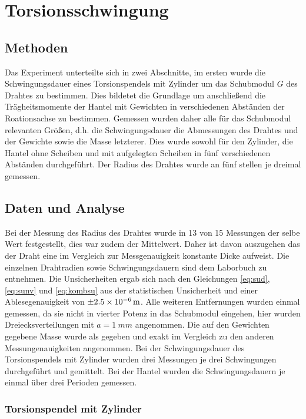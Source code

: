 
\section{Torsionsschwingung}


\subsection{Methoden}
Das Experiment unterteilte sich in zwei Abschnitte, im ersten wurde die Schwingungsdauer eines Torsionspendels mit Zylinder um das Schubmodul $G$ des Drahtes zu bestimmen. Dies bildetet die Grundlage um anschließend die Trägheitsmomente der Hantel mit Gewichten in verschiedenen Abständen der Roationsachse zu bestimmen.
Gemessen wurden daher alle für das Schubmodul relevanten Größen, d.h. die Schwingungsdauer die Abmessungen des Drahtes und der Gewichte sowie die Masse letzterer. Dies wurde sowohl für den Zylinder, die Hantel ohne Scheiben und mit aufgelegten Scheiben in fünf verschiedenen Abständen durchgeführt. Der Radius des Drahtes wurde an fünf stellen je dreimal gemessen.


\subsection{Daten und Analyse}
 Bei der Messung des Radius des Drahtes wurde in 13 von 15 Messungen der selbe Wert festgestellt, dies war zudem der Mittelwert. Daher ist davon auszugehen das der Draht eine im Vergleich zur Messgenauigkeit konstante Dicke aufweist. Die einzelnen Drahtradien sowie Schwingungsdauern sind dem Laborbuch zu entnehmen. Die Unsicherheiten ergab sich nach den Gleichungen \ref{eq:sud}, \ref{eq:sunv} und \ref{eq:kombsu} aus der statistischen Unsicherheit und einer Ablesegenauigkeit von $\SI{\pm 2.5e-6}{m}$.
 Alle weiteren Entfernungen wurden einmal gemessen, da sie nicht in vierter Potenz in das Schubmodul eingehen, hier wurden Dreiecksverteilungen mit $a=\SI{1}{mm}$ angenommen. Die auf den Gewichten gegebene Masse wurde als gegeben und exakt im Vergleich zu den anderen Messungenauigkeiten angenommen. Bei der Schwingungsdauer des Torsionspendels mit Zylinder wurden drei Messungen je drei Schwingungen durchgeführt und gemittelt. Bei der Hantel wurden die Schwingungsdauern je einmal über drei Perioden gemessen.\\
 
 
 \subsubsection*{Torsionspendel mit Zylinder}
 
